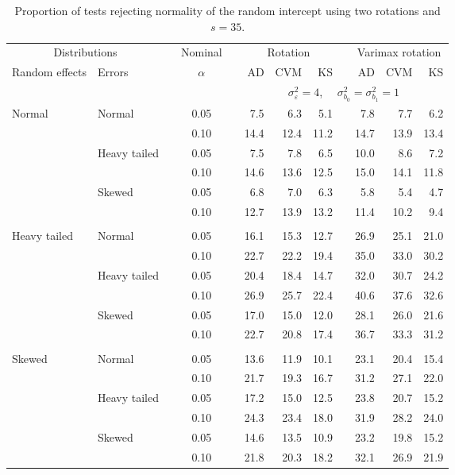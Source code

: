 \begin{table}[ht]
\centering
\caption{\label{tab:fixedsimb035} Proportion of tests rejecting normality of the random intercept using two rotations and $s = 35$.}
\begin{scriptsize}
\begin{tabular}{ll p{.1cm} c p{.1cm} rrr p{.1cm} rrr}
  \hline
  \multicolumn{2}{c}{Distributions}& & Nominal & &  \multicolumn{3}{c}{Rotation} & & \multicolumn{3}{c}{Varimax rotation} \\ \cline{1-2} \cline{6-8} \cline{10-12}   
  Random effects & Errors & & $\alpha$ & & AD & CVM & KS & & AD & CVM & KS \\ 
   \hline
& && && \multicolumn{7}{c}{$\sigma_{\varepsilon}^2 = 4$, \ \ $\sigma_{b_0}^2 = \sigma_{b_1}^2 = 1$} \\ \cline{6-12}
\rowcolor{gray!20} Normal & Normal &  & 0.05 &  & 7.5 & 6.3 & 5.1 &  & 7.8 & 7.7 & 6.2 \\ 
\rowcolor{gray!20}    &  &  & 0.10 &  & 14.4 & 12.4 & 11.2 &  & 14.7 & 13.9 & 13.4 \\ 
\rowcolor{gray!20}    & Heavy tailed &  & 0.05 &  & 7.5 & 7.8 & 6.5 &  & 10.0 & 8.6 & 7.2 \\ 
\rowcolor{gray!20}    &  &  & 0.10 &  & 14.6 & 13.6 & 12.5 &  & 15.0 & 14.1 & 11.8 \\ 
\rowcolor{gray!20}    & Skewed &  & 0.05 &  & 6.8 & 7.0 & 6.3 &  & 5.8 & 5.4 & 4.7 \\ 
\rowcolor{gray!20}    &  &  & 0.10 &  & 12.7 & 13.9 & 13.2 &  & 11.4 & 10.2 & 9.4 \\ 
&&&&&&&&&&&\\
  Heavy tailed & Normal &  & 0.05 &  & 16.1 & 15.3 & 12.7 &  & 26.9 & 25.1 & 21.0 \\ 
   &  &  & 0.10 &  & 22.7 & 22.2 & 19.4 &  & 35.0 & 33.0 & 30.2 \\ 
   & Heavy tailed &  & 0.05 &  & 20.4 & 18.4 & 14.7 &  & 32.0 & 30.7 & 24.2 \\ 
   &  &  & 0.10 &  & 26.9 & 25.7 & 22.4 &  & 40.6 & 37.6 & 32.6 \\ 
   & Skewed &  & 0.05 &  & 17.0 & 15.0 & 12.0 &  & 28.1 & 26.0 & 21.6 \\ 
   &  &  & 0.10 &  & 22.7 & 20.8 & 17.4 &  & 36.7 & 33.3 & 31.2 \\ 
&&&&&&&&&&&\\
  Skewed & Normal &  & 0.05 &  & 13.6 & 11.9 & 10.1 &  & 23.1 & 20.4 & 15.4 \\ 
   &  &  & 0.10 &  & 21.7 & 19.3 & 16.7 &  & 31.2 & 27.1 & 22.0 \\ 
   & Heavy tailed &  & 0.05 &  & 17.2 & 15.0 & 12.5 &  & 23.8 & 20.7 & 15.2 \\ 
   &  &  & 0.10 &  & 24.3 & 23.4 & 18.0 &  & 31.9 & 28.2 & 24.0 \\ 
   & Skewed &  & 0.05 &  & 14.6 & 13.5 & 10.9 &  & 23.2 & 19.8 & 15.2 \\ 
   &  &  & 0.10 &  & 21.8 & 20.3 & 18.2 &  & 32.1 & 26.9 & 21.9 \\ 



\end{tabular}
\end{scriptsize}
\end{table}
